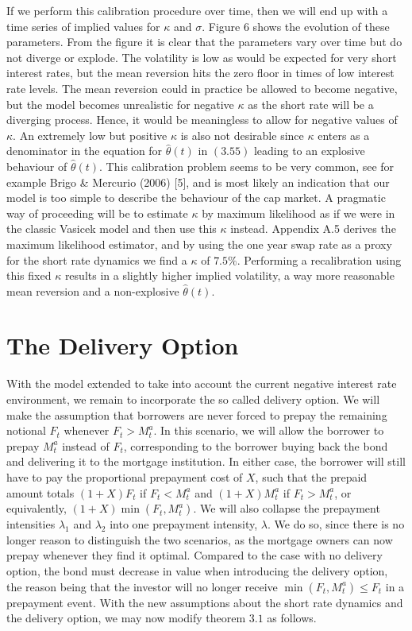 \documentclass[12pt,twoside]{reedthesis}
\begin{document}
If we perform this calibration procedure over time, then we will end up with a time series of implied values for \(\kappa\) and \(\sigma\). Figure 6 shows the evolution of these parameters. From the figure it is clear that the parameters vary over time but do not diverge or explode. The volatility is low as would be expected for very short interest rates, but the mean reversion hits the zero floor in times of low interest rate levels. The mean reversion could in practice be allowed to become negative, but the model becomes unrealistic for negative \(\kappa\) as the short rate will be a diverging process. Hence, it would be meaningless to allow for negative values of \(\kappa\). An extremely low but positive \(\kappa\) is also not desirable since \(\kappa\) enters as a denominator in the equation for \(\hat{\theta}(t)\) in \((3.55)\) leading to an explosive behaviour of \(\hat{\theta}(t)\). This calibration problem seems to be very common, see for example Brigo \& Mercurio (2006) {[}5{]}, and is most likely an indication that our model is too simple to describe the behaviour of the cap market. A pragmatic way of proceeding will be to estimate \(\kappa\) by maximum likelihood as if we were in the classic Vasicek model and then use this \(\kappa\) instead. Appendix A.5 derives the maximum likelihood estimator, and by using the one year swap rate as a proxy for the short rate dynamics we find a \(\kappa\) of \(7.5 \%\). Performing a recalibration using this fixed \(\kappa\) results in a slightly higher implied volatility, a way more reasonable mean reversion and a non-explosive \(\hat{\theta}(t)\).

\hypertarget{the-delivery-option}{%
\section{The Delivery Option}\label{the-delivery-option}}

With the model extended to take into account the current negative interest rate environment, we remain to incorporate the so called delivery option. We will make the assumption that borrowers are never forced to prepay the remaining notional \(F_{t}\) whenever \(F_{t}>M_{t}^{a}\). In this scenario, we will allow the borrower to prepay \(M_{t}^{a}\) instead of \(F_{t}\), corresponding to the borrower buying back the bond and delivering it to the mortgage institution. In either case, the borrower will still have to pay the proportional prepayment cost of \(X\), such that the prepaid amount totals \((1+X) F_{t}\) if \(F_{t}<M_{t}^{a}\) and \((1+X) M_{t}^{a}\) if \(F_{t}>M_{t}^{a}\), or equivalently, \((1+X) \min \left(F_{t}, M_{t}^{a}\right)\). We will also collapse the prepayment intensities \(\lambda_{1}\) and \(\lambda_{2}\) into one prepayment intensity, \(\lambda\). We do so, since there is no longer reason to distinguish the two scenarios, as the mortgage owners can now prepay whenever they find it optimal. Compared to the case with no delivery option, the bond must decrease in value when introducing the delivery option, the reason being that the investor will no longer receive \(\min \left(F_{t}, M_{t}^{a}\right) \leq F_{t}\) in a prepayment event. With the new assumptions about the short rate dynamics and the delivery option, we may now modify theorem \(3.1\) as follows.
\end{document}
